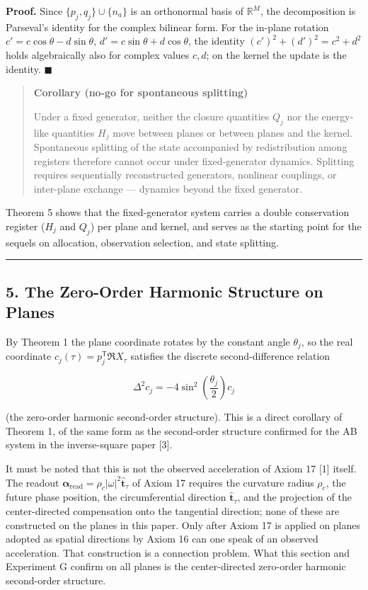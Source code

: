 \documentclass[
  a4paper,
]{article}
\newcounter{none} %
\begin{document}
\textbf{Proof.} Since \(\{p_j,q_j\}\cup\{n_a\}\) is an orthonormal basis
of \(\mathbb R^M\), the decomposition is Parseval's identity for the
complex bilinear form. For the in-plane rotation
\(c'=c\cos\theta-d\sin\theta\), \(d'=c\sin\theta+d\cos\theta\), the
identity \((c')^2+(d')^2=c^2+d^2\) holds algebraically also for complex
values \(c,d\); on the kernel the update is the identity.
\(\blacksquare\)

\begin{quote}
\textbf{Corollary (no-go for spontaneous splitting)}

Under a fixed generator, neither the closure quantities \(Q_j\) nor the
energy-like quantities \(H_j\) move between planes or between planes and
the kernel. Spontaneous splitting of the state accompanied by
redistribution among registers therefore cannot occur under
fixed-generator dynamics. Splitting requires sequentially reconstructed
generators, nonlinear couplings, or inter-plane exchange --- dynamics
beyond the fixed generator.
\end{quote}

Theorem 5 shows that the fixed-generator system carries a double
conservation register (\(H_j\) and \(Q_j\)) per plane and kernel, and
serves as the starting point for the sequels on allocation, observation
selection, and state splitting.

\begin{center}\rule{0.5\linewidth}{0.5pt}\end{center}

\subsection{5. The Zero-Order Harmonic Structure on
Planes}\label{the-zero-order-harmonic-structure-on-planes}

By Theorem 1 the plane coordinate rotates by the constant angle
\(\theta_j\), so the real coordinate
\(c_j(\tau)=p_j^{\mathsf T}\Re X_\tau\) satisfies the discrete
second-difference relation

\[
\Delta^2c_j
=-4\sin^2\!\left(\frac{\theta_j}{2}\right)c_j
\]

(the zero-order harmonic second-order structure). This is a direct
corollary of Theorem 1, of the same form as the second-order structure
confirmed for the AB system in the inverse-square paper {[}3{]}.

It must be noted that this is not the observed acceleration of Axiom 17
{[}1{]} itself. The readout
\(\boldsymbol\alpha_{\mathrm{read}}=\rho_c\lvert\omega\rvert^2\hat{\boldsymbol t}_\tau\)
of Axiom 17 requires the curvature radius \(\rho_c\), the future phase
position, the circumferential direction \(\hat{\boldsymbol t}_\tau\),
and the projection of the center-directed compensation onto the
tangential direction; none of these are constructed on the planes in
this paper. Only after Axiom 17 is applied on planes adopted as spatial
directions by Axiom 16 can one speak of an observed acceleration. That
construction is a connection problem. What this section and Experiment G
confirm on all planes is the center-directed zero-order harmonic
second-order structure.
\end{document}
